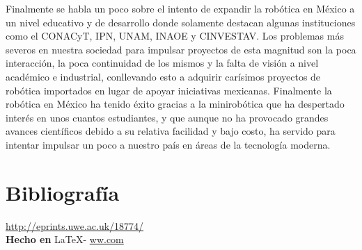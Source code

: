 \documentclass{article}
\begin{document}
{Finalmente se habla un poco sobre el intento de expandir la robótica en México a un nivel educativo y de desarrollo donde solamente destacan algunas instituciones como el CONACyT, IPN, UNAM, INAOE y CINVESTAV. Los problemas más severos en nuestra sociedad para impulsar proyectos de esta magnitud son la poca interacción, la poca continuidad de los mismos y la falta de visión a nivel académico e industrial, conllevando esto a adquirir carísimos proyectos de robótica importados en lugar de apoyar iniciativas mexicanas. Finalmente la robótica en México ha tenido éxito gracias a la minirobótica que ha despertado interés en unos cuantos estudiantes, y que aunque no ha provocado grandes avances científicos debido a su relativa facilidad y bajo costo, ha servido para intentar impulsar un poco a nuestro país en áreas de la tecnología moderna.
}

\vspace{2cm}

\section*{Bibliograf\'ia}

\noindent \url{http://eprints.uwe.ac.uk/18774/}
\\

\large{\hfill \textbf{Hecho en } \LaTeX - \url{ww.com}}
\end{document}
